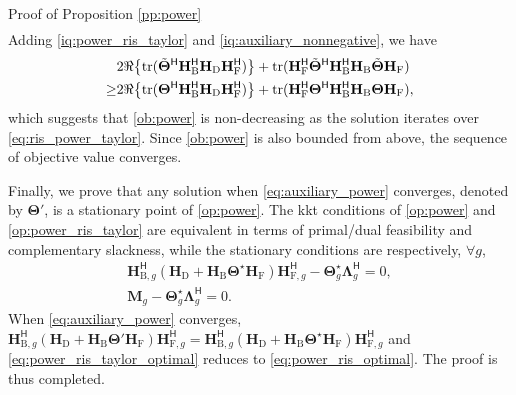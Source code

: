 \documentclass[journal]{IEEEtran}
\begin{document}
\begin{appendix}
\begin{subsection}{Proof of Proposition \ref{pp:power}}
\begin{equation}
\begin{split}
			\end{split}
		\end{equation}
		Adding \eqref{iq:power_ris_taylor} and \eqref{iq:auxiliary_nonnegative}, we have
		\begin{equation}
			\begin{split}
				& 2 \Re \bigl\{\operatorname{tr}(\tilde{\mathbf{\Theta}}^\mathsf{H} \mathbf{H}_\mathrm{B}^\mathsf{H} \mathbf{H}_\mathrm{D} \mathbf{H}_\mathrm{F}^\mathsf{H}) \bigr\} + \operatorname{tr}(\mathbf{H}_\mathrm{F}^\mathsf{H} \tilde{\mathbf{\Theta}}^\mathsf{H} \mathbf{H}_\mathrm{B}^\mathsf{H} \mathbf{H}_\mathrm{B} \tilde{\mathbf{\Theta}} \mathbf{H}_\mathrm{F}) \\
				\ge & 2 \Re \bigl\{\operatorname{tr}({\mathbf{\Theta}}^\mathsf{H} \mathbf{H}_\mathrm{B}^\mathsf{H} \mathbf{H}_\mathrm{D} \mathbf{H}_\mathrm{F}^\mathsf{H}) \bigr\} + \operatorname{tr}(\mathbf{H}_\mathrm{F}^\mathsf{H} {\mathbf{\Theta}}^\mathsf{H} \mathbf{H}_\mathrm{B}^\mathsf{H} \mathbf{H}_\mathrm{B} {\mathbf{\Theta}} \mathbf{H}_\mathrm{F}),
			\end{split}
		\end{equation}
		which suggests that \eqref{ob:power} is non-decreasing as the solution iterates over \eqref{eq:ris_power_taylor}.
		Since \eqref{ob:power} is also bounded from above, the sequence of objective value converges.

		Finally, we prove that any solution when \eqref{eq:auxiliary_power} converges, denoted by $\mathbf{\Theta}'$, is a stationary point of \eqref{op:power}.
		The \gls{kkt} conditions of \eqref{op:power} and \eqref{op:power_ris_taylor} are equivalent in terms of primal/dual feasibility and complementary slackness, while the stationary conditions are respectively, $\forall g$,
		\begin{gather}
			\mathbf{H}_{\mathrm{B},g}^\mathsf{H} (\mathbf{H}_\mathrm{D} + \mathbf{H}_\mathrm{B} \mathbf{\Theta}^\star \mathbf{H}_\mathrm{F}) \mathbf{H}_{\mathrm{F},g}^\mathsf{H} - \mathbf{\Theta}_g^\star \mathbf{\Lambda}_g^\mathsf{H} = 0,\label{eq:power_ris_optimal}\\
			\mathbf{M}_g - \mathbf{\Theta}_g^\star \mathbf{\Lambda}_g^\mathsf{H} = 0.\label{eq:power_ris_taylor_optimal}
		\end{gather}
		When \eqref{eq:auxiliary_power} converges, $\mathbf{H}_{\mathrm{B},g}^\mathsf{H} (\mathbf{H}_\mathrm{D} + \mathbf{H}_\mathrm{B} \mathbf{\Theta}' \mathbf{H}_\mathrm{F}) \mathbf{H}_{\mathrm{F},g}^\mathsf{H} = \mathbf{H}_{\mathrm{B},g}^\mathsf{H} (\mathbf{H}_\mathrm{D} + \mathbf{H}_\mathrm{B} \mathbf{\Theta}^\star \mathbf{H}_\mathrm{F}) \mathbf{H}_{\mathrm{F},g}^\mathsf{H}$ and \eqref{eq:power_ris_taylor_optimal} reduces to \eqref{eq:power_ris_optimal}.
		The proof is thus completed.
	\end{subsection}


\end{appendix}
\end{document}
